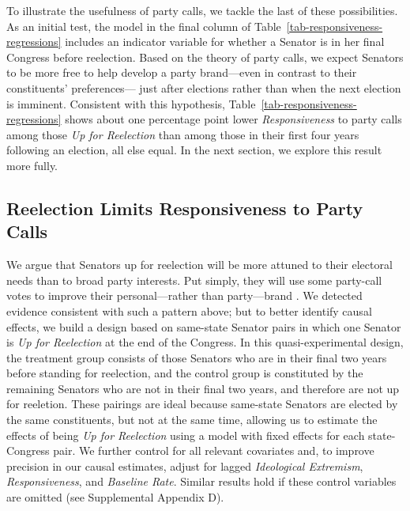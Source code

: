 \documentclass[12pt]{article}
\begin{document}
To illustrate the usefulness of party calls, we tackle the last of these possibilities. As an initial test, the model in the final column of Table~\ref{tab-responsiveness-regressions} includes an indicator variable for whether a Senator is in her final Congress before reelection.
Based on the theory of party calls,
we expect Senators to be more free to help develop a party brand---even
in contrast to their constituents' preferences---
just after elections
rather than when the next election is imminent.
Consistent with this hypothesis, Table~\ref{tab-responsiveness-regressions} shows about one percentage point lower \textit{Responsiveness} to party calls among those \textit{Up for Reelection} than among those in their first four years following an election, all else equal.  In the next section, we explore this result more fully.

\subsection*{Reelection Limits Responsiveness to Party Calls}

We argue that Senators up for reelection will be more attuned to their electoral needs than to broad party interests. Put simply, they will use some party-call votes to improve their personal---rather than party---brand
\citep[e.g.,][]{Canes-Wrone:2002, Carson:2010}.  We detected evidence consistent with such a pattern above; but to better identify causal effects, we build a design based on same-state Senator pairs in which one Senator is \textit{Up for Reelection} at the end of the Congress.  In this quasi-experimental design, the treatment group consists of those Senators who are in their final two years before standing for reelection, and the control group is constituted by the remaining Senators who are not in their final two years, and therefore are not up for reeletion.  These pairings are ideal because same-state Senators are elected by the same constituents, but not at the same time, allowing us to estimate the effects of being \textit{Up for Reelection} using a model with fixed effects for each state-Congress pair.  We further control for all relevant covariates and, to improve precision in our causal estimates, adjust for lagged \textit{Ideological Extremism}, \textit{Responsiveness}, and \textit{Baseline Rate}. Similar results hold if these control variables are omitted (see Supplemental Appendix D).
\end{document}
